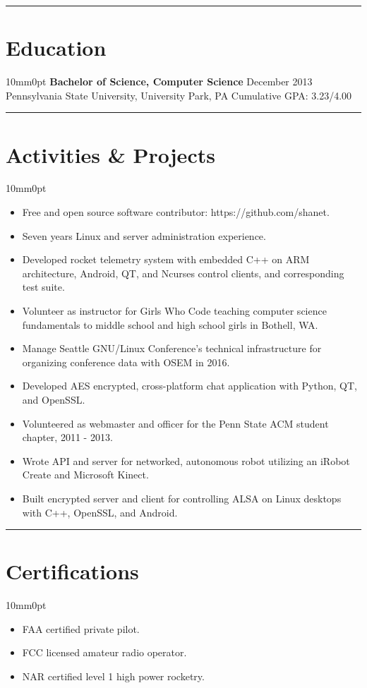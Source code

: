 \documentclass[letterpaper]{article}
\newcommand{\sectionrule}[1] {
  \noindent\rule{\textwidth}{.1mm}
  \vspace{-11mm}
  \section{#1}
}
\newenvironment{indentsection}
  {\begin{adjustwidth}{10mm}{0pt}}
  {\end{adjustwidth}}
\begin{document}
  \sectionrule{Education}

  \begin{indentsection}
    \textbf{Bachelor of Science, Computer Science} \hfill December 2013\\
    Pennsylvania State University, University Park, PA \hfill Cumulative GPA: 3.23/4.00
  \end{indentsection}

  \sectionrule{Activities \& Projects}

  \begin{indentsection}
    \begin{itemize}
      \item Free and open source software contributor: https://github.com/shanet.
      \item Seven years Linux and server administration experience.
      \item Developed rocket telemetry system with embedded C++ on ARM architecture, Android, QT, and Ncurses control clients, and corresponding test suite.
      \item Volunteer as instructor for Girls Who Code teaching computer science fundamentals to middle school and high school girls in Bothell, WA.
      \item Manage Seattle GNU/Linux Conference's technical infrastructure for organizing conference data with OSEM in 2016.
      \item Developed AES encrypted, cross-platform chat application with Python, QT, and OpenSSL.
      \item Volunteered as webmaster and officer for the Penn State ACM student chapter, 2011 - 2013.
      \item Wrote API and server for networked, autonomous robot utilizing an iRobot Create and Microsoft Kinect.
      \item Built encrypted server and client for controlling ALSA on Linux desktops with C++, OpenSSL, and Android.
    \end{itemize}
  \end{indentsection}

  \sectionrule{Certifications}

  \begin{indentsection}
    \begin{itemize}
      \item FAA certified private pilot.
      \item FCC licensed amateur radio operator.
      \item NAR certified level 1 high power rocketry.
    \end{itemize}
  \end{indentsection}
\end{document}
